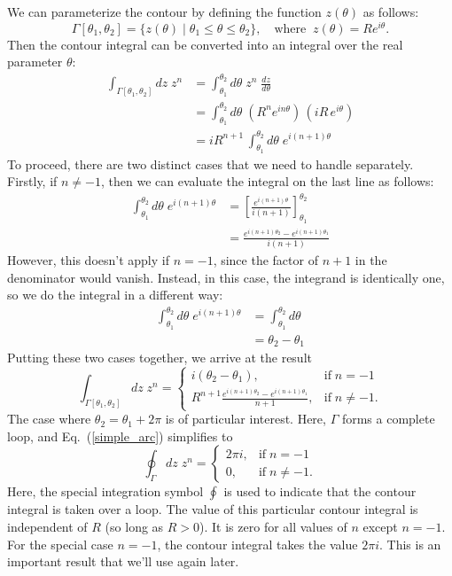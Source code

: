 \documentclass[10pt,a4paper]{article}
\begin{document}
We can parameterize the contour by defining the function $z(\theta)$
as follows:
\begin{equation}
  \Gamma[\theta_1,\theta_2] = \big\{z(\theta) \;\big|\; \theta_1 \le \theta \le \theta_2\big\},
  \quad \mathrm{where}\;\; z(\theta) = R e^{i\theta}.
\end{equation}
Then the contour integral can be converted into an integral over the
real parameter $\theta$:
\begin{align}
  \int_{\Gamma[\theta_1,\theta_2]} dz\; z^n &= \int_{\theta_1}^{\theta_2}  d\theta \; z^n \; \frac{dz}{d\theta} \\
  &= \int_{\theta_1}^{\theta_2}  d\theta \; \left( R^ne^{in\theta}\right)\, \left(iR\, e^{i\theta}\right) \\
  &= i R^{n+1} \, \int_{\theta_1}^{\theta_2}  d\theta \; e^{i(n+1)\theta}
\end{align}
To proceed, there are two distinct cases that we need to handle
separately. Firstly, if $n \ne -1$, then we can evaluate the integral
on the last line as follows:
\begin{align}
  \int_{\theta_1}^{\theta_2} d\theta \; e^{i(n+1)\theta}
  &= \left[\frac{e^{i(n+1)\theta}}{i(n+1)}\right]_{\theta_1}^{\theta_2} \\
  &= \frac{e^{i(n+1)\theta_2} - e^{i(n+1)\theta_1}}{i(n+1)}
\end{align}
However, this doesn't apply if $n = -1$, since the factor of $n + 1$
in the denominator would vanish. Instead, in this case, the integrand
is identically one, so we do the integral in a different way:
\begin{align}
  \int_{\theta_1}^{\theta_2} d\theta \; e^{i(n+1)\theta}
  &= \int_{\theta_1}^{\theta_2} d\theta \\
  &= \theta_2 - \theta_1
\end{align}
Putting these two cases together, we arrive at the result
\begin{equation}
\int_{\Gamma[\theta_1,\theta_2]} dz\; z^n
= \left\{\begin{array}{ll}i(\theta_2 - \theta_1), & \mathrm{if}\;n = -1 \\
\displaystyle R^{n+1}\frac{e^{i(n+1)\theta_2} - e^{i(n+1)\theta_1}}{n+1},
&\mathrm{if}\;n\ne -1.\end{array}\right.
\label{simple_arc}
\end{equation}
The case where $\theta_2 = \theta_1 + 2\pi$ is of particular interest.
Here, $\Gamma$ forms a complete loop, and Eq.~(\ref{simple_arc})
simplifies to
\begin{equation}
  \oint_{\Gamma} dz\; z^n = \left\{\begin{array}{ll}2\pi i,
  & \mathrm{if}\;n = -1 \\
  \displaystyle 0,&\mathrm{if}\;n\ne -1.\end{array}\right.
\end{equation}
Here, the special integration symbol $\oint$ is used to indicate that
the contour integral is taken over a loop. The value of this
particular contour integral is independent of $R$ (so long as $R >
0$). It is zero for all values of $n$ except $n = -1$. For the special
case $n = - 1$, the contour integral takes the value $2\pi i$. This is
an important result that we'll use again later.
\end{document}
